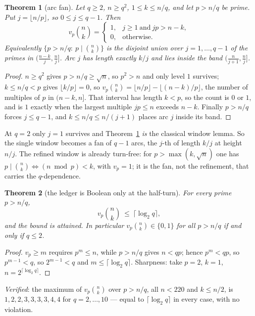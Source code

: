\documentclass[11pt]{article}
\newtheorem{theorem}{Theorem}
\begin{document}
\begin{theorem}[arc fan]\label{thm:fan}
Let $q\ge2$, $n\ge q^{2}$, $1\le k\le n/q$, and let $p>n/q$ be prime.  Put $j=\lfloor n/p\rfloor$,
so $0\le j\le q-1$.  Then
\[
  v_p\binom nk=
  \begin{cases}
    1,&j\ge1\ \text{and}\ jp>n-k,\\
    0,&\text{otherwise.}
  \end{cases}
\]
Equivalently $\{p>n/q:\ p\mid\binom nk\}$ is the disjoint union over $j=1,\dots,q-1$ of the
primes in $\bigl(\tfrac{n-k}{j},\tfrac nj\bigr]$.  Arc $j$ has length exactly $k/j$ and lies
inside the band $(\tfrac n{j+1},\tfrac nj]$.
\end{theorem}

\begin{proof}
$n\ge q^{2}$ gives $p>n/q\ge\sqrt n$, so $p^{2}>n$ and only level $1$ survives; $k\le n/q<p$
gives $\lfloor k/p\rfloor=0$, so $v_p\binom nk=\lfloor n/p\rfloor-\lfloor(n-k)/p\rfloor$, the
number of multiples of $p$ in $(n-k,n]$.  That interval has length $k<p$, so the count is $0$
or $1$, and is $1$ exactly when the largest multiple $jp\le n$ exceeds $n-k$.  Finally
$p>n/q$ forces $j\le q-1$, and $k\le n/q\le n/(j+1)$ places arc $j$ inside its band.
\end{proof}

At $q=2$ only $j=1$ survives and Theorem~\ref{thm:fan} \emph{is} the classical window lemma.
So the single window becomes a fan of $q-1$ arcs, the $j$-th of length $k/j$ at height $n/j$.
The refined window is already turn-free: for $p>\max(k,\sqrt n)$ one has
$p\mid\binom nk\iff(n\bmod p)<k$, with $v_p=1$; it is the fan, not the refinement, that
carries the $q$-dependence.

\begin{theorem}[the ledger is Boolean only at the half-turn]\label{thm:boolean}
For every prime $p>n/q$,
\[
  v_p\binom nk\ \le\ \bigl\lceil\log_2 q\bigr\rceil ,
\]
and the bound is attained.  In particular $v_p\binom nk\in\{0,1\}$ for all $p>n/q$ if and only
if $q\le2$.
\end{theorem}

\begin{proof}
$v_p\ge m$ requires $p^{m}\le n$, while $p>n/q$ gives $n<qp$; hence $p^{m}<qp$, so
$p^{m-1}<q$, so $2^{m-1}<q$ and $m\le\lceil\log_2q\rceil$.  Sharpness: take $p=2$, $k=1$,
$n=2^{\lceil\log_2q\rceil}$.
\end{proof}

\emph{Verified}: the maximum of $v_p\binom nk$ over $p>n/q$, all $n<220$ and $k\le n/2$, is
$1,2,2,3,3,3,3,4,4$ for $q=2,\dots,10$ --- equal to $\lceil\log_2q\rceil$ in every case, with
no violation.
\end{document}
